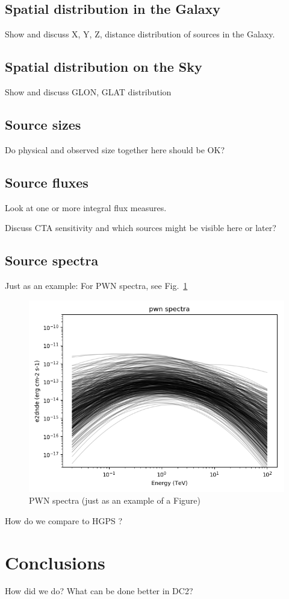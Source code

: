 \documentclass{article}
\begin{document}
\subsection{Spatial distribution in the Galaxy}

Show and discuss X, Y, Z, distance distribution of sources in the Galaxy.

\subsection{Spatial distribution on the Sky}

Show and discuss GLON, GLAT distribution

\subsection{Source sizes}

Do physical and observed size together here should be OK?

\subsection{Source fluxes}

Look at one or more integral flux measures.

Discuss CTA sensitivity and which sources might be visible here or later?

\subsection{Source spectra}

Just as an example: For PWN spectra, see Fig.~\ref{fig:pwn_spec}

\begin{figure}[t]
\begin{center}
\includegraphics[width=1.0\textwidth]
{../sky_model_checks/ctadc_skymodel_gps_sources_spectra_pwn}
\caption{PWN spectra (just as an example of a Figure)}
\label{fig:pwn_spec}
\end{center}
\end{figure}


How do we compare to HGPS \citep{2013arXiv1307.4868C}?

\section{Conclusions}

How did we do? What can be done better in DC2?





\end{document}
